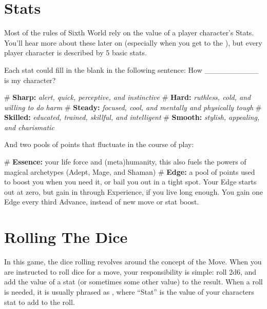 \section{Stats} \label{stats}

Most of the rules of Sixth World rely on the value of a player character’s Stats. You’ll hear more about these later on (especially when you get to the ), but every player character is described by 5 basic stats.

Each stat could fill in the blank in the following sentence: How \_\_\_\_\_\_\_\_\_\_ is my character?

\begin{easylist}
    # \textbf{Sharp:} \textit{alert, quick, perceptive, and instinctive}
    # \textbf{Hard:} \textit{ruthless, cold, and willing to do harm}
    # \textbf{Steady:} \textit{focused, cool, and mentally and physically tough}
    # \textbf{Skilled:} \textit{educated, trained, skillful, and intelligent}
    # \textbf{Smooth:} \textit{stylish, appealing, and charismatic}
\end{easylist}

And two pools of points that fluctuate in the course of play:

\begin{easylist}
# \textbf{Essence:} your life force and (meta)humanity, this also fuels the powers of magical archetypes (Adept, Mage, and Shaman)
# \textbf{Edge:} a pool of points used to boost you when you need it, or bail you out in a tight spot. Your Edge starts out at zero, but gain in through Experience, if you live long enough. You gain one Edge every third Advance, instead of new move or stat boost.
\end{easylist}




\section{Rolling The Dice}

In this game, the dice rolling revolves around the concept of the Move. When you are instructed to roll dice for a move, your responsibility is simple: roll 2d6, and add the value of a stat (or sometimes some other value) to the result. When a roll is needed, it is usually phrased as , where ``Stat'' is the value of your characters stat to add to the roll.

